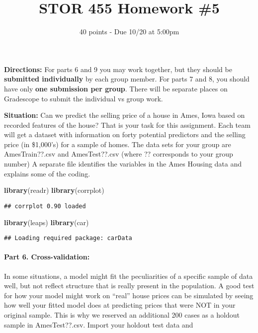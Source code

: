 \documentclass[
]{article}
\title{STOR 455 Homework \#5}
\subtitle{40 points - Due 10/20 at 5:00pm}
\author{}
\date{\vspace{-2.5em}}
\newenvironment{Shaded}{\begin{snugshade}}{\end{snugshade}}
\newcommand{\KeywordTok}[1]{\textcolor[rgb]{0.13,0.29,0.53}{\textbf{#1}}}
\newcommand{\NormalTok}[1]{#1}
\begin{document}
\maketitle

\textbf{Directions:} For parts 6 and 9 you may work together, but they
should be \textbf{submitted individually} by each group member. For
parts 7 and 8, you should have only \textbf{one submission per group}.
There will be separate places on Gradescope to submit the individual vs
group work.

\textbf{Situation:} Can we predict the selling price of a house in Ames,
Iowa based on recorded features of the house? That is your task for this
assignment. Each team will get a dataset with information on forty
potential predictors and the selling price (in \$1,000's) for a sample
of homes. The data sets for your group are AmesTrain??.csv and
AmesTest??.csv (where ?? corresponds to your group number) A separate
file identifies the variables in the Ames Housing data and explains some
of the coding.

\begin{Shaded}
\begin{Highlighting}[]
\KeywordTok{library}\NormalTok{(readr)}
\KeywordTok{library}\NormalTok{(corrplot)}
\end{Highlighting}
\end{Shaded}

\begin{verbatim}
## corrplot 0.90 loaded
\end{verbatim}

\begin{Shaded}
\begin{Highlighting}[]
\KeywordTok{library}\NormalTok{(leaps)}
\KeywordTok{library}\NormalTok{(car)}
\end{Highlighting}
\end{Shaded}

\begin{verbatim}
## Loading required package: carData
\end{verbatim}

\hypertarget{part-6.-cross-validation}{%
\paragraph{Part 6. Cross-validation:}\label{part-6.-cross-validation}}

In some situations, a model might fit the peculiarities of a specific
sample of data well, but not reflect structure that is really present in
the population. A good test for how your model might work on ``real''
house prices can be simulated by seeing how well your fitted model does
at predicting prices that were NOT in your original sample. This is why
we reserved an additional 200 cases as a holdout sample in
AmesTest??.csv. Import your holdout test data and
\end{document}
